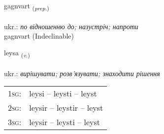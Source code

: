 \documentclass[frontgrid, backgrid]{flacards}\usepackage[]{graphicx}\usepackage[]{xcolor}
\begin{document}

\renewcommand{\flhead}{\vskip5pt \fboxsep=0pt {\small\bfseries\footnotesize Forsetning | прийменник}}
\renewcommand{\fcfoot}{\vskip5pt \fboxsep=0pt \hspace{2pt}{\small\bfseries\footnotesize 1K}}

\renewcommand{\blhead}{\vskip5pt {\small\bfseries\footnotesize Forsetning | прийменник }}
\renewcommand{\bcfoot}{\vskip5pt \hspace{2pt}{\small\bfseries\footnotesize 1K}}


{gagnvart \small{\textsubscript{(\textit{prep.})}} \\[1ex]
\textphonetic{[kakvar̥t]} \\
ukr.: \emph{по відношенню до; назустріч; напроти} \\  [2ex]
gagnvart (Indeclinable)}

\renewcommand{\flhead}{\vskip5pt \fboxsep=0pt {\small\bfseries\footnotesize Sagnorð | дієслово}}
\renewcommand{\fcfoot}{\vskip5pt \fboxsep=0pt \hspace{2pt}{\small\bfseries\footnotesize 1K}}

\renewcommand{\blhead}{\vskip5pt {\small\bfseries\footnotesize Sagnorð | дієслово }}
\renewcommand{\bcfoot}{\vskip5pt \hspace{2pt}{\small\bfseries\footnotesize 1K}}


{leysa \small{\textsubscript{(\textit{v.})}} \\[1ex] %
\textphonetic{[leiːsa]} \\
ukr.: \emph{вирішувати; розв'язувати; знаходити рішення} \\  [2ex]
\renewcommand*{\arraystretch}{0.8}
\begin{tabular}{p{1cm}l}
\textsc{1sg}: & leysi -- leysti -- leyst \\ 
\textsc{2sg}: & leysir -- leystir -- leyst \\ 
\textsc{3sg}: & leysir -- leysti -- leyst \\ 
\end{tabular}
}
\end{document}
